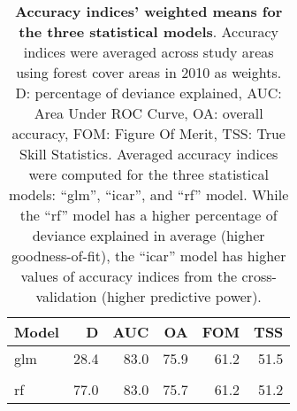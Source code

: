 \documentclass[
  12pt,
]{article}
\begin{document}
\begin{table}[H]

\caption{\label{tab:accuracy}\textbf{Accuracy indices' weighted means for the three statistical models}. Accuracy indices were averaged across study areas using forest cover areas in 2010 as weights. D: percentage of deviance explained, AUC: Area Under ROC Curve, OA: overall accuracy, FOM: Figure Of Merit, TSS: True Skill Statistics. Averaged accuracy indices were computed for the three statistical models: ``glm'', ``icar'', and ``rf'' model. While the ``rf'' model has a higher percentage of deviance explained in average (higher goodness-of-fit), the ``icar'' model has higher values of accuracy indices from the cross-validation (higher predictive power).\vspace{0.5cm}}
\centering
\begin{tabular}[t]{lrrrrr}
\toprule
Model & D & AUC & OA & FOM & TSS\\
\midrule
glm & 28.4 & 83.0 & 75.9 & 61.2 & 51.5\\
\cellcolor{gray!6}{icar} & \cellcolor{gray!6}{38.6} & \cellcolor{gray!6}{86.9} & \cellcolor{gray!6}{79.1} & \cellcolor{gray!6}{65.6} & \cellcolor{gray!6}{58.2}\\
rf & 77.0 & 83.0 & 75.7 & 61.2 & 51.2\\
\bottomrule
\end{tabular}
\end{table}
\end{document}
